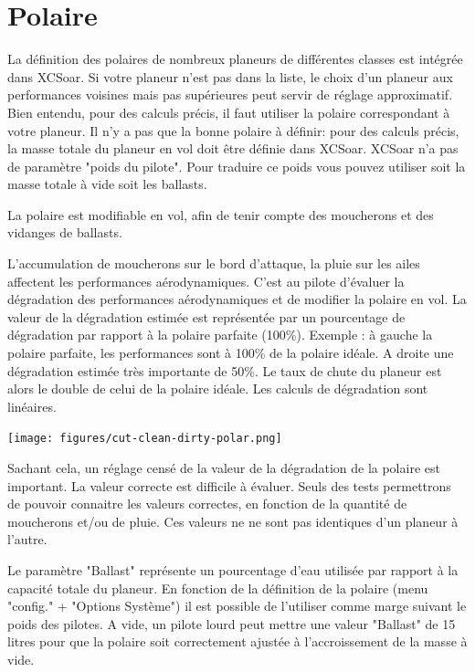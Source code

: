 \section{Polaire}
La définition des polaires de nombreux planeurs de différentes classes est intégrée dans XCSoar. Si votre planeur n'est pas dans la liste, le choix d'un planeur aux performances voisines mais pas supérieures peut servir de réglage approximatif. Bien entendu, pour des calculs précis, il faut utiliser la polaire correspondant à votre planeur. Il n'y a pas que la bonne polaire à définir: pour des calculs précis, la masse totale du planeur en vol doit être définie dans XCSoar. XCSoar n'a pas de paramètre "poids du pilote". Pour traduire ce poids vous pouvez utiliser soit la masse totale à vide soit les ballasts.

La polaire est modifiable en vol, afin de tenir compte des moucherons et des vidanges de ballasts.

L'accumulation de moucherons sur le bord d'attaque, la pluie sur les ailes affectent les performances aérodynamiques. C'est au pilote d'évaluer la dégradation des performances aérodynamiques et de modifier la polaire en vol. La valeur de la dégradation estimée est représentée par un pourcentage de dégradation par rapport à la polaire parfaite (100\%). Exemple : à gauche la polaire parfaite, les performances sont à 100\% de la polaire idéale. A droite une dégradation estimée très importante de 50\%. Le taux de chute du planeur est alors le double de celui de la polaire idéale. Les calculs de dégradation sont linéaires. 

\begin{center}
\texttt{[image: figures/cut-clean-dirty-polar.png]}
\end{center}
Sachant cela, un réglage censé de la valeur de la dégradation de la polaire est important. La valeur correcte est difficile à évaluer. Seuls des tests permettrons de pouvoir connaitre les valeurs correctes, en fonction de la quantité de moucherons et/ou de pluie. Ces valeurs ne ne sont pas identiques d'un planeur à l'autre. 

Le paramètre "Ballast" représente un pourcentage d'eau utilisée par rapport à la capacité totale du planeur. En fonction de la définition de la polaire (menu "config." + "Options Système") il est possible de l'utiliser comme marge suivant le poids des pilotes. A vide, un pilote lourd peut mettre une valeur "Ballast" de 15 litres pour que la polaire soit correctement ajustée à l'accroissement de la masse à vide.

